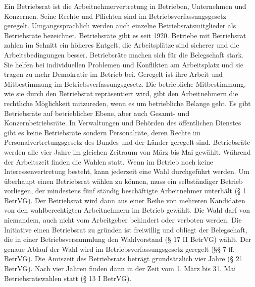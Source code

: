 Ein Betriebsrat ist die Arbeitnehmervertretung in Betrieben, Unternehmen und Konzernen. Seine Rechte und Pflichten sind im Betriebsverfassungsgesetz geregelt. Umgangssprachlich werden auch einzelne Betriebsratsmitglieder als Betriebsräte bezeichnet.  Betriebsräte gibt es seit 1920.
\newline
Betriebe mit Betriebsrat zahlen im Schnitt ein höheres Entgelt, die Arbeitsplätze sind sicherer und die Arbeitsbedingungen besser. Betriebsräte machen sich für die Belegschaft stark. Sie helfen bei individuellen Problemen und Konflikten am Arbeitsplatz und sie tragen zu mehr Demokratie im Betrieb bei. Geregelt ist ihre Arbeit und Mitbestimmung im Betriebsverfassungsgesetz.
\newline
Die betriebliche Mitbestimmung, wie sie durch den Betriebsrat repräsentiert wird, gibt den Arbeitnehmern die rechtliche Möglichkeit mitzureden, wenn es um betriebliche Belange geht.
\newline
Es gibt Betriebsräte auf betrieblicher Ebene, aber auch Gesamt- und Konzernbetriebsräte. In Verwaltungen und Behörden des öffentlichen Dienstes gibt es keine Betriebsräte sondern Personalräte, deren Rechte im Personalvertretungsgesetz des Bundes und der Länder geregelt sind.
\newline 
Betriebsräte werden alle vier Jahre im gleichen Zeitraum von März bis Mai gewählt. 
Während der Arbeitszeit finden die Wahlen statt. 
Wenn im Betrieb noch keine Interessenvertretung besteht, kann jederzeit eine Wahl durchgeführt werden.
\newline 
Um überhaupt einen Betriebsrat wählen zu können, muss ein selbständiger Betrieb vorliegen, der mindestens fünf ständig beschäftigte Arbeitnehmer unterhält (§ 1 BetrVG). \newline
Der Betriebsrat wird dann aus einer Reihe von mehreren Kandidaten von den wahlberechtigten Arbeitnehmern im Betrieb gewählt. Die Wahl darf von niemandem, auch nicht vom Arbeitgeber behindert oder verboten werden.
Die Initiative einen Betriebsrat zu gründen ist freiwillig und obliegt der Belegschaft, die in einer Betriebsversammlung den Wahlvorstand (§ 17 II BetrVG) wählt. \newline
Der genaue Ablauf der Wahl wird im Betriebsverfassungsgesetz geregelt (§§ 7 ff. BetrVG). \newline
Die Amtszeit des Betriebsrats beträgt grundsätzlich vier Jahre (§ 21 BetrVG). Nach vier Jahren finden dann in der Zeit vom 1. März bis 31. Mai Betriebsratswahlen statt (§ 13 I BetrVG).